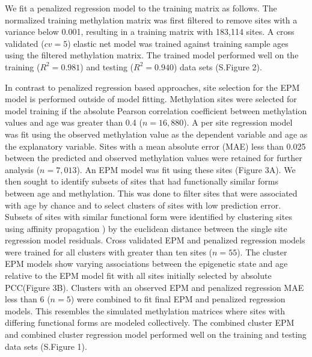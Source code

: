 \documentclass{article}
\begin{document}
{\begin{linenumbers}
We fit a penalized regression model to the training matrix as follows. The normalized training methylation matrix was 
first filtered to remove sites with a variance below 0.001, resulting in a training matrix with 183,114 sites. A 
cross validated ($cv=5$) elastic net model was trained against training sample ages using the filtered methylation 
matrix. The trained model performed well on the training ($R^2=0.981$) and testing ($R^2=0.940$) data sets (S.Figure 2). 

In contrast to penalized regression based approaches, site selection for the EPM model is performed outside of model 
fitting. Methylation sites were selected for model training if the absolute Pearson correlation coefficient between 
methylation values and age was greater than 0.4 ($n=16,880$). A per site regression model was fit using the observed 
methylation value as the dependent variable and age as the explanatory variable. Sites with a mean absolute error 
(MAE) less than 0.025 between the predicted and observed methylation values were retained for further analysis 
($n=7,013$). An EPM model was fit using these sites (Figure 3A). We then sought to identify subsets of sites that 
had functionally similar forms between age and methylation. This was done to filter sites that were associated with 
age by chance and to select clusters of sites with low prediction error. Subsets of sites with similar functional form 
were identified by clustering sites using affinity propagation \cite{Frey2007-mu}) by the euclidean distance between 
the single site regression model residuals. Cross validated EPM and penalized regression models were trained for all 
clusters with greater than ten sites ($n=55$). The cluster EPM models show varying associations between the epigenetic 
state and age relative to the EPM model fit with all sites initially selected by absolute PCC(Figure 3B). Clusters 
with an observed EPM and penalized regression MAE less than 6 ($n=5$) were combined to fit final EPM and penalized 
regression models. This resembles the simulated methylation matrices where sites with differing functional forms are 
modeled collectively. The combined cluster EPM and combined cluster regression model performed well on the training 
and testing data sets (S.Figure 1). 


\end{linenumbers}}
\end{document}
